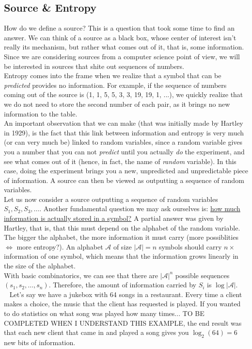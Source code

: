 \documentclass{article}
\newcommand\important[1]{\noindent {\underline{\textsc{#1}}} \ }
\begin{document}
\subsection{Source \& Entropy}
How do we define a source? This is a question that took some time to find an answer. We can think of a source as a black box, whose center of interest isn't really its mechanism, but rather what comes out of it, that is, some information. Since we are considering sources from a computer science point of view, we will be interested in sources that shite out sequences of numbers. \\
Entropy comes into the frame when we realize that a symbol that can be \emph{predicted} provides no information. For example, if the sequence of numbers coming out of the source is (1, 1, 5, 5, 3, 3, 19, 19, 1, ...), we quickly realize that we do not need to store the second number of each pair, as it brings no new information to the table. \\
An important observation that we can make (that was initially made by Hartley in 1929), is the fact that this link between information and entropy is very much (or can very much be) linked to random variables, since a random variable gives you a number that you can not \emph{predict} until you actually \emph{do} the experiment, and see what comes out of it (hence, in fact, the name of \emph{random} variable). In this case, doing the experiment brings you a new, unpredicted and unpredictable piece of information. A source can then be viewed as outputting a sequence of random variables. \\
Let us now consider a source outputting a sequence of random variables $S_1, S_2, S_3, \dots$. Another fundamental question we may ask ourselves is: \ul{how much information is actually stored in a symbol?} A partial answer was given by Hartley, that is, that this must depend on the alphabet of the random variable. The bigger the alphabet, the more information it must carry (more possiblities $\iff$ more entropy?). An alphabet $\mathcal{A}$ of size $|\mathcal{A}| = n $ symbols should carry $n \times$ information of one symbol, which means that the information grows linearly in the size of the alphabet. \\
With basic combinatorics, we can see that there are $|\mathcal A|^n$ possible sequences $(s_1, s_2, \dots, s_n)$. Therefore, the amount of information carried by $S_i$ is $\log|\mathcal A|$. \\
\important{Example 1} Let's say we have a jukebox with 64 songs in a restaurant. Every time a client makes a choice, the music that the client has requested is played. If you wanted to do statistics on what song was played how many times... TO BE COMPLETED WHEN I UNDERSTAND THIS EXAMPLE, the end result was that each new client that came in and played a song gives you $\log_2(64) = 6$ new bits of information.
\end{document}
